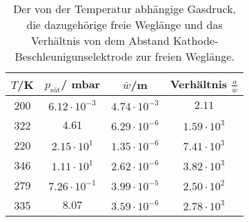 \begin{table}[H]
  \centering
   \begin{tabular}{c c c c }
    \toprule
    $T$/K & $p_{\text{sät}}$/\; mbar & $\bar{w}$/m & Verhältnis $\frac{a}{\bar{w}}$ \\
    \midrule
    200  & $ 6.12 \cdot 10^{-3}$ & $4.74 \cdot 10^{-3}$ & $2.11$\\
    322 & $ 4.61$                & $6.29 \cdot 10^{-6}$ & $1.59 \cdot 10^{3}$\\
    220 & $ 2.15 \cdot 10^{1}$ & $1.35 \cdot 10^{-6}$ & $7.41 \cdot 10^{3}$\\
    346 & $ 1.11 \cdot 10^{1}$ & $2.62 \cdot 10^{-6}$ & $3.82 \cdot 10^{3}$\\
    279 & $ 7.26 \cdot 10^{-1}$ & $3.99 \cdot 10^{-5}$ & $2.50\cdot 10^{2}$\\
    335 & $ 8.07 $              & $3.59 \cdot 10^{-6}$ & $2.78 \cdot 10^{3}$\\
    \bottomrule
  \end{tabular}
  \caption{Der von der Temperatur abhängige Gasdruck, die dazugehörige freie Weglänge
          und das Verhältnis von dem Abstand Kathode-Beschleunigunselektrode zur freien Weglänge.}
  \label{tab:tab1}
\end{table}
